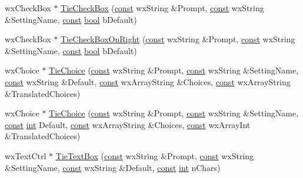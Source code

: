 \begin{DoxyCompactItemize}
\item 
wx\+Check\+Box $\ast$ \hyperlink{class_shuttle_gui_base_a962623c1e5f4c5ba1184be662f31ff8d}{Tie\+Check\+Box} (\hyperlink{getopt1_8c_a2c212835823e3c54a8ab6d95c652660e}{const} wx\+String \&Prompt, \hyperlink{getopt1_8c_a2c212835823e3c54a8ab6d95c652660e}{const} wx\+String \&Setting\+Name, \hyperlink{getopt1_8c_a2c212835823e3c54a8ab6d95c652660e}{const} \hyperlink{mac_2config_2i386_2lib-src_2libsoxr_2soxr-config_8h_abb452686968e48b67397da5f97445f5b}{bool} b\+Default)
\item 
wx\+Check\+Box $\ast$ \hyperlink{class_shuttle_gui_base_a90bd89acc9a648f8f88ea80416a0898c}{Tie\+Check\+Box\+On\+Right} (\hyperlink{getopt1_8c_a2c212835823e3c54a8ab6d95c652660e}{const} wx\+String \&Prompt, \hyperlink{getopt1_8c_a2c212835823e3c54a8ab6d95c652660e}{const} wx\+String \&Setting\+Name, \hyperlink{getopt1_8c_a2c212835823e3c54a8ab6d95c652660e}{const} \hyperlink{mac_2config_2i386_2lib-src_2libsoxr_2soxr-config_8h_abb452686968e48b67397da5f97445f5b}{bool} b\+Default)
\item 
wx\+Choice $\ast$ \hyperlink{class_shuttle_gui_base_a6e9a44d2711ecbf75b4b87e5b1a69043}{Tie\+Choice} (\hyperlink{getopt1_8c_a2c212835823e3c54a8ab6d95c652660e}{const} wx\+String \&Prompt, \hyperlink{getopt1_8c_a2c212835823e3c54a8ab6d95c652660e}{const} wx\+String \&Setting\+Name, \hyperlink{getopt1_8c_a2c212835823e3c54a8ab6d95c652660e}{const} wx\+String \&Default, \hyperlink{getopt1_8c_a2c212835823e3c54a8ab6d95c652660e}{const} wx\+Array\+String \&Choices, \hyperlink{getopt1_8c_a2c212835823e3c54a8ab6d95c652660e}{const} wx\+Array\+String \&Translated\+Choices)
\item 
wx\+Choice $\ast$ \hyperlink{class_shuttle_gui_base_a6731a4a3fba3b0256fc38714e621a34b}{Tie\+Choice} (\hyperlink{getopt1_8c_a2c212835823e3c54a8ab6d95c652660e}{const} wx\+String \&Prompt, \hyperlink{getopt1_8c_a2c212835823e3c54a8ab6d95c652660e}{const} wx\+String \&Setting\+Name, \hyperlink{getopt1_8c_a2c212835823e3c54a8ab6d95c652660e}{const} \hyperlink{xmltok_8h_a5a0d4a5641ce434f1d23533f2b2e6653}{int} Default, \hyperlink{getopt1_8c_a2c212835823e3c54a8ab6d95c652660e}{const} wx\+Array\+String \&Choices, \hyperlink{getopt1_8c_a2c212835823e3c54a8ab6d95c652660e}{const} wx\+Array\+Int \&Translated\+Choices)
\item 
wx\+Text\+Ctrl $\ast$ \hyperlink{class_shuttle_gui_base_ac14fe61081bd25f9b7b59d3399ce18ab}{Tie\+Text\+Box} (\hyperlink{getopt1_8c_a2c212835823e3c54a8ab6d95c652660e}{const} wx\+String \&Prompt, \hyperlink{getopt1_8c_a2c212835823e3c54a8ab6d95c652660e}{const} wx\+String \&Setting\+Name, \hyperlink{getopt1_8c_a2c212835823e3c54a8ab6d95c652660e}{const} wx\+String \&Default, \hyperlink{getopt1_8c_a2c212835823e3c54a8ab6d95c652660e}{const} \hyperlink{xmltok_8h_a5a0d4a5641ce434f1d23533f2b2e6653}{int} n\+Chars)

\end{DoxyCompactItemize}
